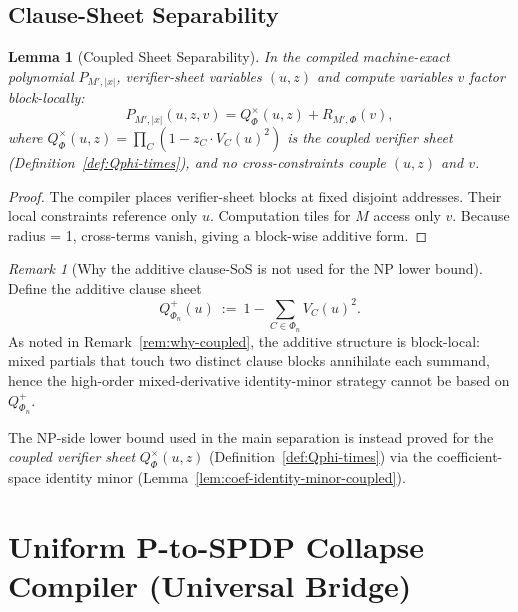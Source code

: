 \documentclass[12pt]{article}
\newtheorem{lemma}[theorem]{Lemma}
\theoremstyle{definition}
\theoremstyle{definition}
\theoremstyle{remark}
\newtheorem{remark}{Remark}
\theoremstyle{remark}
\begin{document}
\subsection{Clause-Sheet Separability}

\begin{lemma}[Coupled Sheet Separability]\label{lem:sheet-formal}
In the compiled machine-exact polynomial $P_{M',|x|}$,
verifier-sheet variables $(u,z)$
and compute variables $v$ factor block-locally:
\[
P_{M',|x|}(u,z,v) = Q^{\times}_\Phi(u,z) + R_{M',\Phi}(v),
\]
where $Q^{\times}_\Phi(u,z) = \prod_C (1 - z_C \cdot V_C(u)^2)$ is the coupled verifier sheet (Definition~\ref{def:Qphi-times}),
and no cross-constraints couple $(u,z)$ and $v$.
\end{lemma}

\begin{proof}
The compiler places verifier-sheet blocks at fixed disjoint addresses.
Their local constraints reference only $u$.
Computation tiles for $M$ access only $v$.
Because radius = 1, cross-terms vanish, giving a block-wise additive form.
\end{proof}

\begin{remark}[Why the additive clause-SoS is not used for the NP lower bound]
\label{rem:additive-not-used}
Define the additive clause sheet
\[
Q^{+}_{\Phi_n}(u)\ :=\ 1-\sum_{C\in\Phi_n} V_C(u)^2.
\]
As noted in Remark~\ref{rem:why-coupled}, the additive structure is block-local:
mixed partials that touch two distinct clause blocks annihilate each summand, hence the
high-order mixed-derivative identity-minor strategy cannot be based on $Q^{+}_{\Phi_n}$.

The NP-side lower bound used in the main separation is instead proved for the
\emph{coupled verifier sheet} $Q^{\times}_{\Phi}(u,z)$ (Definition~\ref{def:Qphi-times})
via the coefficient-space identity minor
(Lemma~\ref{lem:coef-identity-minor-coupled}).
\end{remark}


\section{Uniform P-to-SPDP Collapse Compiler (Universal Bridge)}
\label{sec:uniform-bridge}
\end{document}
